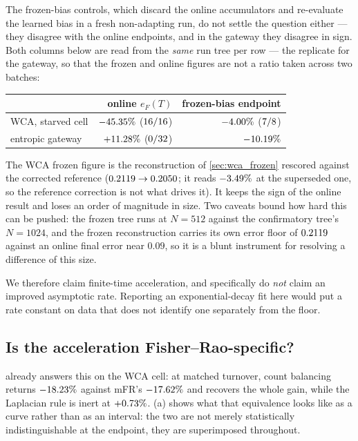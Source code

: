 The frozen-bias controls, which discard the online accumulators and re-evaluate the learned
bias in a fresh non-adapting run, do not settle the question either --- they disagree with the
online endpoints, and in the gateway they disagree in sign. Both columns below are read from the
\emph{same} run tree per row --- the replicate for the gateway, so that the frozen and online
figures are not a ratio taken across two batches:

\begin{center}\small
\begin{tabular}{@{}lrr@{}}
\toprule
 & online $e_F(T)$ & frozen-bias endpoint \\
\midrule
WCA, starved cell & $-45.35\%$ ($16/16$)
                  & $-4.00\%$ ($7/8$) \\
entropic gateway  & $+11.28\%$ ($0/32$) & $-10.19\%$ \\
\bottomrule
\end{tabular}
\end{center}

The WCA frozen figure is the reconstruction of \cref{sec:wca_frozen} rescored against the
corrected reference ($0.2119 \to 0.2050$; it reads $-3.49\%$ at the
superseded one, so the reference correction is not what drives it). It keeps the sign of the
online result and loses an order of magnitude in size. Two caveats bound how hard this can be
pushed: the frozen tree runs at $N=512$ against the confirmatory tree's $N=1024$, and the
frozen reconstruction carries its own error floor of $0.2119$ against an online final
error near $0.09$, so it is a blunt instrument for resolving a difference of this size.

We therefore claim finite-time acceleration, and specifically do \emph{not} claim an improved
asymptotic rate. Reporting an exponential-decay fit here would put a rate constant on data that
does not identify one separately from the floor.

\subsection{Is the acceleration Fisher--Rao-specific?}
\label{sec:conv_specific}

 already answers this on the WCA cell: at matched turnover, count balancing
returns $-18.23\%$ against mFR's $-17.62\%$ and recovers the whole gain, while the
Laplacian rule is inert at $+0.73\%$. (a) shows what that
equivalence looks like as a curve rather than as an interval: the two are not merely
statistically indistinguishable at the endpoint, they are superimposed throughout.

